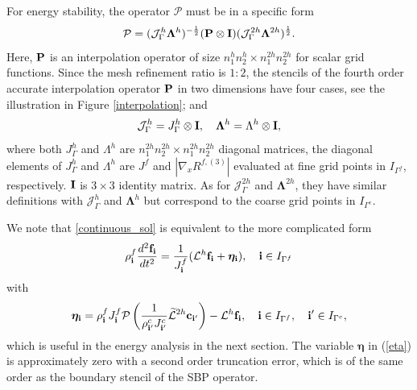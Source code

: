 For energy stability, the operator ${\mathcal{P}}$ must be in a specific form
\[{\mathcal{P}} = (\mathcal{J}^h_\Gamma \bm{\Lambda}^h)^{-\frac{1}{2}}({\bf P}\otimes{\bf I})(\mathcal{J}^{2h}_\Gamma \bm{\Lambda}^{2h})^{\frac{1}{2}}.\]
Here, ${\bf P}$ {\color{red} is an interpolation operator of size $n_1^hn_2^h\times n_1^{2h}n_2^{2h}$ for scalar grid functions}. Since the mesh refinement ratio is $1:2$, the stencils of the fourth order accurate interpolation operator ${\bf P}$ in two dimensions have four cases, see the illustration in  Figure \ref{interpolation}; and 
\[\mathcal{J}_{\Gamma}^h = J^{h}_{\Gamma} \otimes {\bf I},\quad {\bm{\Lambda}^h} = \Lambda^h\otimes {\bf I},\]
where both $J_{\Gamma}^h$ and $\Lambda^h$ are $n_1^{2h}n_2^{2h}\times n_1^{2h}n_2^{2h}$ diagonal matrices, the diagonal elements of $J_{\Gamma}^h$ and $\Lambda^{h}$ are $J^f$ and $|\nabla_x R^{f,(3)}|$ evaluated at fine grid points in $I_{\Gamma^f}$, respectively. ${\bf I}$ is $3\times 3$ identity matrix. As for $\mathcal{J}_{\Gamma}^{2h}$ and ${\bm{\Lambda}^{2h}}$, they have similar definitions with $\mathcal{J}_{\Gamma}^{h}$ and ${\bm{\Lambda}^{h}}$ but correspond to the coarse grid points in $I_{\Gamma^c}$.

We note that \eqref{continuous_sol} is equivalent to the more complicated form
\begin{equation}\label{elastic_semi_f_i}
{\rho}^f_{\bf i} \frac{d^2{\bf f}_{\bf i}}{dt^2} =
\frac{1}{J^f_{\bf i}}(\mathcal{L}^h{\bf f}_{\bf i} + {\bm \eta}_{\bf i}), \quad {\bf i}\in I_{\Gamma^f}
\end{equation}
with 
\begin{equation}\label{eta}
{\bm \eta}_{\bf i} = {\rho}^f_{\bf i}J^f_{\bf i}{\mathcal{P}}\left(\frac{1}{\rho^c_{{\bf i}'}J^c_{{\bf i}'}}\wt{\mathcal{L}}^{2h} {\bf c}_{{\bf i}'}\right) - \mathcal{L}^{h}{\bf f}_{\bf i}, \quad {\bf i}\in I_{\Gamma^f},\quad {{\bf i}'}\in I_{\Gamma^c},
\end{equation}
which is useful in the energy analysis in the next section. The variable $\bm \eta$ in (\ref{eta}) is approximately zero with a second order truncation error, which is of the same order as the boundary stencil of the SBP operator. %

